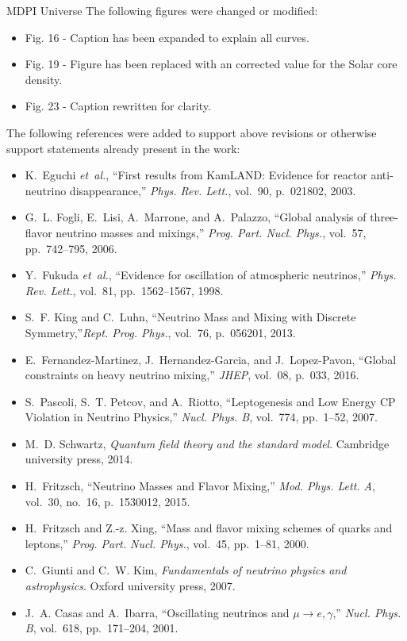 \documentclass[a4paper, 10pt]{letter}
\begin{document}
\begin{letter}{MDPI Universe}
The following figures were changed or modified:
\begin{itemize}
    \item Fig. 16 - Caption has been expanded to explain all curves.
    \item Fig. 19 - Figure has been replaced with an corrected value for the Solar core density.
    \item Fig. 23 - Caption rewritten for clarity.
\end{itemize}

The following references were added to support above revisions or otherwise support statements already present in the work:
\begin{itemize}
    \item K.~Eguchi {\em et~al.}, ``{First results from KamLAND: Evidence for reactor anti-neutrino disappearance},'' {\em Phys. Rev. Lett.}, vol.~90, p.~021802, 2003.
    \item G.~L. Fogli, E.~Lisi, A.~Marrone, and A.~Palazzo, ``{Global analysis of three-flavor neutrino masses and mixings},'' {\em Prog. Part. Nucl. Phys.}, vol.~57, pp.~742--795, 2006.
    \item Y.~Fukuda {\em et~al.}, ``{Evidence for oscillation of atmospheric neutrinos},'' {\em Phys. Rev. Lett.}, vol.~81, pp.~1562--1567, 1998.
    \item S.~F. King and C.~Luhn, ``{Neutrino Mass and Mixing with Discrete Symmetry},''{\em Rept. Prog. Phys.}, vol.~76, p.~056201, 2013.
    \item E.~Fernandez-Martinez, J.~Hernandez-Garcia, and J.~Lopez-Pavon, ``{Global constraints on heavy neutrino mixing},'' {\em JHEP}, vol.~08, p.~033, 2016.
    \item S.~Pascoli, S.~T. Petcov, and A.~Riotto, ``{Leptogenesis and Low Energy CP Violation in Neutrino Physics},'' {\em Nucl. Phys. B}, vol.~774, pp.~1--52, 2007.
    \item M.~D. Schwartz, {\em Quantum field theory and the standard model}. Cambridge university press, 2014.
    \item H.~Fritzsch, ``{Neutrino Masses and Flavor Mixing},'' {\em Mod. Phys. Lett. A}, vol.~30, no.~16, p.~1530012, 2015.
    \item H.~Fritzsch and Z.-z. Xing, ``{Mass and flavor mixing schemes of quarks and leptons},'' {\em Prog. Part. Nucl. Phys.}, vol.~45, pp.~1--81, 2000.
    \item C.~Giunti and C.~W. Kim, {\em Fundamentals of neutrino physics and astrophysics}. Oxford university press, 2007.
    \item J.~A. Casas and A.~Ibarra, ``{Oscillating neutrinos and $\mu \to e, \gamma$},'' {\em Nucl. Phys. B}, vol.~618, pp.~171--204, 2001.

\end{itemize}
\end{letter}
\end{document}
